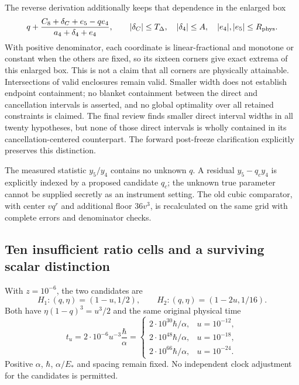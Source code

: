 The reverse derivation additionally keeps that dependence in the enlarged box
\begin{equation}
 q+\frac{C_8+\delta_C+e_5-qe_4}{a_4+\delta_4+e_4},\qquad
 |\delta_C|\le T_\Delta,\quad |\delta_4|\le A,\quad
 |e_4|,|e_5|\le R_{\rm phys}.
 \label{r28:eq:ai3-shared-corners}
\end{equation}
With positive denominator, each coordinate is linear-fractional and monotone or constant when the others are fixed, so its sixteen corners give exact extrema of this enlarged box. This is not a claim that all corners are physically attainable. Intersections of valid enclosures remain valid. Smaller width does not establish endpoint containment; no blanket containment between the direct and cancellation intervals is asserted, and no global optimality over all retained constraints is claimed. The final review finds smaller direct interval widths in all twenty hypotheses, but none of those direct intervals is wholly contained in its cancellation-centered counterpart. The forward post-freeze clarification explicitly preserves this distinction.

The measured statistic $y_5/y_4$ contains no unknown $q$. A residual $y_5-q_cy_4$ is explicitly indexed by a proposed candidate $q_c$; the unknown true parameter cannot be supplied secretly as an instrument setting. The old cubic comparator, with center $vq^r$ and additional floor $36v^3$, is recalculated on the same grid with complete errors and denominator checks.

\subsection{Ten insufficient ratio cells and a surviving scalar distinction}
With $z=10^{-6}$, the two candidates are
\begin{equation}
 H_1:(q,\eta)=(1-u,1/2),\qquad
 H_2:(q,\eta)=(1-2u,1/16).
 \label{r28:eq:ai3-candidates}
\end{equation}
Both have $\eta(1-q)^3=u^3/2$ and the same original physical time
\begin{equation}
 t_u=2\cdot10^{-6}u^{-3}\frac{\hbar}{\alpha}
 =\begin{cases}
 2\cdot10^{30}\hbar/\alpha,&u=10^{-12},\\
 2\cdot10^{48}\hbar/\alpha,&u=10^{-18},\\
 2\cdot10^{66}\hbar/\alpha,&u=10^{-24}.
 \end{cases}
 \label{r28:eq:ai3-clock}
\end{equation}
Positive $\alpha$, $\hbar$, $\alpha/E_*$ and spacing remain fixed. No independent clock adjustment for the candidates is permitted.

